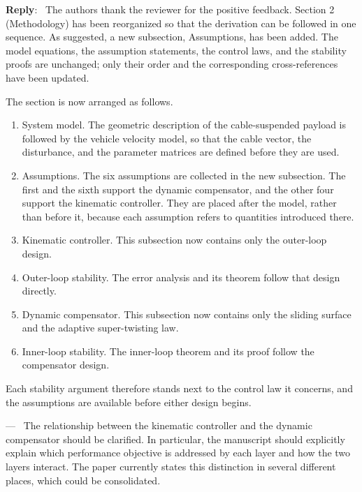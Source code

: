 \documentclass[11pt]{article}
\newcounter{reviewer}
\newcounter{point}[reviewer]
\renewcommand{\thepoint}{Comment\,\thereviewer.\arabic{point}}
\newenvironment{point}
   {\refstepcounter{point} \bigskip \noindent {\textbf{Reviewer~\thepoint} } ---\ }
   {\par }
\newenvironment{reply}
   {\medskip \noindent \color{blue} \begin{sf}\textbf{Reply}:\  }
   {\medskip \par \end{sf}}
\begin{document}
\begin{reply}
The authors thank the reviewer for the positive feedback. Section 2 (Methodology) has been reorganized so that the derivation can be followed in one sequence. As suggested, a new subsection, Assumptions, has been added. The model equations, the assumption statements, the control laws, and the stability proofs are unchanged; only their order and the corresponding cross-references have been updated.

The section is now arranged as follows.
\begin{enumerate}
    \item System model. The geometric description of the cable-suspended payload is followed by the vehicle velocity model, so that the cable vector, the disturbance, and the parameter matrices are defined before they are used.
    \item Assumptions. The six assumptions are collected in the new subsection. The first and the sixth support the dynamic compensator, and the other four support the kinematic controller. They are placed after the model, rather than before it, because each assumption refers to quantities introduced there.
    \item Kinematic controller. This subsection now contains only the outer-loop design.
    \item Outer-loop stability. The error analysis and its theorem follow that design directly.
    \item Dynamic compensator. This subsection now contains only the sliding surface and the adaptive super-twisting law.
    \item Inner-loop stability. The inner-loop theorem and its proof follow the compensator design.
\end{enumerate}
Each stability argument therefore stands next to the control law it concerns, and the assumptions are available before either design begins.
\end{reply}

\begin{point}
The relationship between the kinematic controller and the dynamic compensator should be clarified. In particular, the manuscript should explicitly explain which performance objective is addressed by each layer and how the two layers interact. The paper currently states this distinction in several different places, which could be consolidated.
\end{point}
\end{document}
